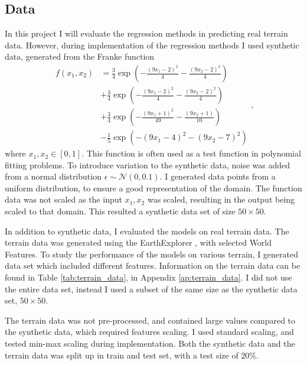\subsection{Data}\label{ssec:data}
In this project I will evaluate the regression methods in predicting real terrain data. However, during implementation of the regression methods I used synthetic data, generated from the Franke function 
\begin{equation}\label{eq:franke_function}
\begin{split}
    f(x_{1}, x_{2}) &= \frac{3}{4} \exp(- \frac{(9x_{1}-2)^{2}}{4} - \frac{(9x_{2}-2)^{2}}{4} ) \\
    &+ \frac{3}{4} \exp(- \frac{(9x_{1}-2)^{2}}{4} - \frac{(9x_{2}-2)^{2}}{4} ) \\
    &+ \frac{3}{4} \exp(- \frac{(9x_{1}+1)^{2}}{49} - \frac{(9x_{2}+1)}{10} ) \\ 
    &- \frac{1}{5} \exp(- (9x_{1}-4)^{2} - (9x_{2}-7)^{2} ) 
\end{split}, 
\end{equation}
where $x_{1}, x_{2} \in [0, 1]$. This function is often used as a test function in polynomial fitting problems. To introduce variation to the synthetic data, noise was added from a normal distribution $\epsilon \sim \mathcal{N}(0, 0.1)$. I generated data points from a uniform distribution, to ensure a good representation of the domain. The function data was not scaled as the input $x_{1}, x_{2}$ was scaled, resulting in the output being scaled to that domain. This resulted a synthetic data set of size $50 \times 50$.

In addition to synthetic data, I evaluated the models on real terrain data. The terrain data was generated using the EarthExplorer \cite{usgov:2024:earthexplorer}, with selected World Features. To study the performance of the models on various terrain, I generated data set which included different features. Information on the terrain data can be found in Table \ref{tab:terrain_data}, in Appendix \ref{ap:terrain_data}. I did not use the entire data set, instead I used a subset of the same size as the synthetic data set, $50 \times 50$.

The terrain data was not pre-processed, and contained large values compared to the synthetic data, which required features scaling. I used standard scaling, and tested min-max scaling during implementation. Both the synthetic data and the terrain data was split up in train and test set, with a test size of $20\%$.


